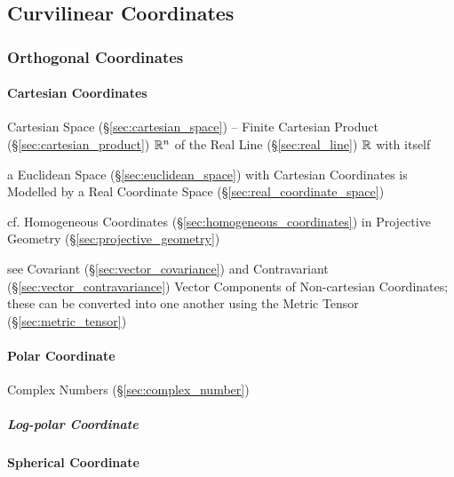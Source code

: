 \subsection{Curvilinear Coordinates}\label{sec:curvilinear_coordinates}

\subsubsection{Orthogonal Coordinates}\label{sec:orthogonal_coordinates}

\paragraph{Cartesian Coordinates}\label{sec:cartesian_coordinates}\hfill

Cartesian Space (\S\ref{sec:cartesian_space}) -- Finite Cartesian Product
(\S\ref{sec:cartesian_product}) $\mathbb{R}^n$ of the Real Line
(\S\ref{sec:real_line}) $\mathbb{R}$ with itself

a Euclidean Space (\S\ref{sec:euclidean_space}) with Cartesian Coordinates is
Modelled by a Real Coordinate Space (\S\ref{sec:real_coordinate_space})

cf. Homogeneous Coordinates (\S\ref{sec:homogeneous_coordinates}) in Projective
Geometry (\S\ref{sec:projective_geometry})

see Covariant (\S\ref{sec:vector_covariance}) and Contravariant
(\S\ref{sec:vector_contravariance}) Vector Components of Non-cartesian
Coordinates; these can be converted into one another using the Metric Tensor
(\S\ref{sec:metric_tensor})



\paragraph{Polar Coordinate}\label{sec:polar_coordinates}\hfill

\fist Complex Numbers (\S\ref{sec:complex_number})



\subparagraph{Log-polar Coordinate}\label{sec:logpolar_coordinates}\hfill



\paragraph{Spherical Coordinate}\label{sec:spherical_coordinates}\hfill

